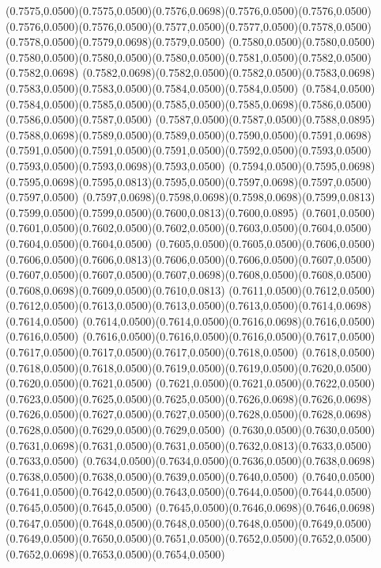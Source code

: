 (0.7575,0.0500)(0.7575,0.0500)(0.7576,0.0698)(0.7576,0.0500)(0.7576,0.0500)
\PST@Solid(0.7576,0.0500)(0.7576,0.0500)(0.7577,0.0500)(0.7577,0.0500)(0.7578,0.0500)(0.7578,0.0500)(0.7579,0.0698)(0.7579,0.0500)
(0.7580,0.0500)(0.7580,0.0500)(0.7580,0.0500)(0.7580,0.0500)(0.7580,0.0500)(0.7581,0.0500)(0.7582,0.0500)(0.7582,0.0698)
(0.7582,0.0698)(0.7582,0.0500)(0.7582,0.0500)(0.7583,0.0698)(0.7583,0.0500)(0.7583,0.0500)(0.7584,0.0500)(0.7584,0.0500)
(0.7584,0.0500)(0.7584,0.0500)(0.7585,0.0500)(0.7585,0.0500)(0.7585,0.0698)(0.7586,0.0500)(0.7586,0.0500)(0.7587,0.0500)
(0.7587,0.0500)(0.7587,0.0500)(0.7588,0.0895)(0.7588,0.0698)(0.7589,0.0500)(0.7589,0.0500)(0.7590,0.0500)(0.7591,0.0698)
(0.7591,0.0500)(0.7591,0.0500)(0.7591,0.0500)(0.7592,0.0500)(0.7593,0.0500)(0.7593,0.0500)(0.7593,0.0698)(0.7593,0.0500)
(0.7594,0.0500)(0.7595,0.0698)(0.7595,0.0698)(0.7595,0.0813)(0.7595,0.0500)(0.7597,0.0698)(0.7597,0.0500)(0.7597,0.0500)
(0.7597,0.0698)(0.7598,0.0698)(0.7598,0.0698)(0.7599,0.0813)(0.7599,0.0500)(0.7599,0.0500)(0.7600,0.0813)(0.7600,0.0895)
(0.7601,0.0500)(0.7601,0.0500)(0.7602,0.0500)(0.7602,0.0500)(0.7603,0.0500)(0.7604,0.0500)(0.7604,0.0500)(0.7604,0.0500)
(0.7605,0.0500)(0.7605,0.0500)(0.7606,0.0500)(0.7606,0.0500)(0.7606,0.0813)(0.7606,0.0500)(0.7606,0.0500)(0.7607,0.0500)
(0.7607,0.0500)(0.7607,0.0500)(0.7607,0.0698)(0.7608,0.0500)(0.7608,0.0500)(0.7608,0.0698)(0.7609,0.0500)(0.7610,0.0813)
(0.7611,0.0500)(0.7612,0.0500)(0.7612,0.0500)(0.7613,0.0500)(0.7613,0.0500)(0.7613,0.0500)(0.7614,0.0698)(0.7614,0.0500)
(0.7614,0.0500)(0.7614,0.0500)(0.7616,0.0698)(0.7616,0.0500)(0.7616,0.0500)
\PST@Solid(0.7616,0.0500)(0.7616,0.0500)(0.7616,0.0500)(0.7617,0.0500)(0.7617,0.0500)(0.7617,0.0500)(0.7617,0.0500)(0.7618,0.0500)
(0.7618,0.0500)(0.7618,0.0500)(0.7618,0.0500)(0.7619,0.0500)(0.7619,0.0500)(0.7620,0.0500)(0.7620,0.0500)(0.7621,0.0500)
(0.7621,0.0500)(0.7621,0.0500)(0.7622,0.0500)(0.7623,0.0500)(0.7625,0.0500)(0.7625,0.0500)(0.7626,0.0698)(0.7626,0.0698)
(0.7626,0.0500)(0.7627,0.0500)(0.7627,0.0500)(0.7628,0.0500)(0.7628,0.0698)(0.7628,0.0500)(0.7629,0.0500)(0.7629,0.0500)
(0.7630,0.0500)(0.7630,0.0500)(0.7631,0.0698)(0.7631,0.0500)(0.7631,0.0500)(0.7632,0.0813)(0.7633,0.0500)(0.7633,0.0500)
(0.7634,0.0500)(0.7634,0.0500)(0.7636,0.0500)(0.7638,0.0698)(0.7638,0.0500)(0.7638,0.0500)(0.7639,0.0500)(0.7640,0.0500)
(0.7640,0.0500)(0.7641,0.0500)(0.7642,0.0500)(0.7643,0.0500)(0.7644,0.0500)(0.7644,0.0500)(0.7645,0.0500)(0.7645,0.0500)
(0.7645,0.0500)(0.7646,0.0698)(0.7646,0.0698)(0.7647,0.0500)(0.7648,0.0500)(0.7648,0.0500)(0.7648,0.0500)(0.7649,0.0500)
(0.7649,0.0500)(0.7650,0.0500)(0.7651,0.0500)(0.7652,0.0500)(0.7652,0.0500)(0.7652,0.0698)(0.7653,0.0500)(0.7654,0.0500)
